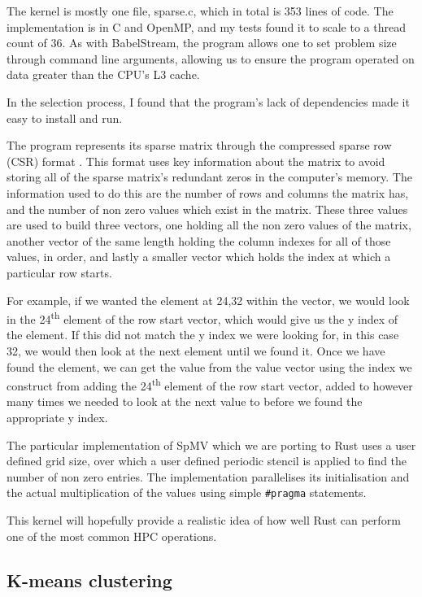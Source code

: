 The kernel is mostly one file, sparse.c, which in total is 353 lines of code. The implementation is in C and OpenMP, and my tests found it to scale to a thread count of 36. As with BabelStream, the program allows one to set problem size through command line arguments, allowing us to ensure the program operated on data greater than the CPU's L3 cache.

In the selection process, I found that the program's lack of dependencies made it easy to install and run.

The program represents its sparse matrix through the compressed sparse row (CSR) format . This format uses key information about the matrix to avoid storing all of the sparse matrix's redundant zeros in the computer's memory. The information used to do this are the number of rows and columns the matrix has, and the number of non zero values which exist in the matrix. These three values are used to build three vectors, one holding all the non zero values of the matrix, another vector of the same length holding the column indexes for all of those values, in order, and lastly a smaller vector which holds the index at which a particular row starts.

For example, if we wanted the element at 24,32 within the vector, we would look in the 24\textsuperscript{th} element of the row start vector, which would give us the y index of the element. If this did not match the y index we were looking for, in this case 32, we would then look at the next element until we found it. Once we have found the element, we can get the value from the value vector using the index we construct from adding the 24\textsuperscript{th} element of the row start vector, added to however many times we needed to look at the next value to before we found the appropriate y index.

The particular implementation of SpMV which we are porting to Rust uses a user defined grid size, over which a user defined periodic stencil is applied to find the number of non zero entries. The implementation parallelises its initialisation and the actual multiplication of the values using simple \texttt{\#pragma} statements.

This kernel will hopefully provide a realistic idea of how well Rust can perform one of the most common HPC operations.

\subsection{K-means clustering}

